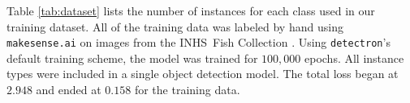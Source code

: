 \documentclass[conference]{IEEEtran}
\begin{document}
Table \ref{tab:dataset} lists the number of instances for each class 
used in our training dataset.
All of the training data was labeled by hand using \verb|makesense.ai| \cite{make-sense}
on images from the INHS\ Fish Collection \cite{INHS}.
Using \verb|detectron|'s default training scheme, the model was trained for \(100,000\) epochs. All instance types were included in a single object detection model. The total loss began at \(2.948\) and ended at \(0.158\) for the training data.

\end{document}
